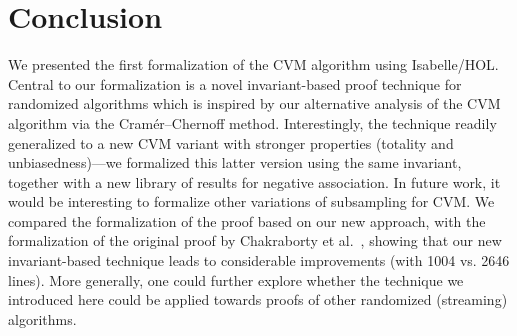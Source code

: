 \section{Conclusion}\label{sec:conclusion}
We presented the first formalization of the CVM algorithm using Isabelle/HOL.
Central to our formalization is a novel invariant-based proof technique for randomized algorithms which is inspired by our alternative analysis of the CVM algorithm via the Cram\'{e}r--Chernoff method.
Interestingly, the technique readily generalized to a new CVM variant with stronger properties (totality and unbiasedness)---we formalized this latter version using the same invariant, together with a new library of results for negative association.
In future work, it would be interesting to formalize other variations of subsampling for CVM.
We compared the formalization of the proof based on our new approach, with the formalization of the original proof by Chakraborty et al.~\cite{chakraborty2023}, showing that our new invariant-based technique leads to considerable improvements (with 1004 vs. 2646 lines).
More generally, one could further explore whether the technique we introduced here could be applied towards proofs of other randomized (streaming) algorithms.
